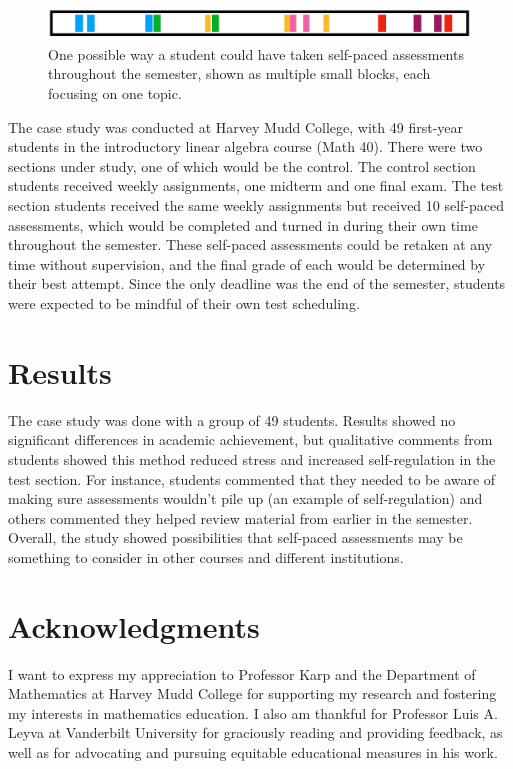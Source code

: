 \documentclass[thesis]{hmcposter}
\begin{document}
\begin{poster}
\begin{figure}
\begin{center}
\includegraphics[width=12in]{spa}
\caption{One possible way a student could have taken self-paced assessments throughout the semester, shown as multiple small blocks, each focusing on one topic.}%
\end{center}
\end{figure}

The case study was conducted at Harvey Mudd College, with 49 first-year students in the introductory linear algebra course (Math 40). There were two sections under study, one of which would be the control. The control section students received weekly assignments, one midterm and one final exam. The test section students received the same weekly assignments but received 10 self-paced assessments, which would be completed and turned in during their own time throughout the semester. These self-paced assessments could be retaken at any time without supervision, and the final grade of each would be determined by their best attempt. Since the only deadline was the end of the semester, students were expected to be mindful of their own test scheduling.

\section{Results}%
The case study was done with a group of 49 students. Results showed no significant differences in academic achievement, but qualitative comments from students showed this method reduced stress and increased self-regulation in the test section. For instance, students commented that they needed to be aware of making sure assessments wouldn't pile up (an example of self-regulation) and others commented they helped review material from earlier in the semester. Overall, the study showed possibilities that self-paced assessments may be something to consider in other courses and different institutions.




\vfill

\section{Acknowledgments}
I want to express my appreciation to Professor Karp and the Department of Mathematics at Harvey Mudd College for supporting my research and fostering my interests in mathematics education. I also am thankful for Professor Luis A. Leyva at Vanderbilt University for graciously reading and providing feedback, as well as for advocating and pursuing equitable educational measures in his work.

\vfill
\end{poster}
\end{document}
